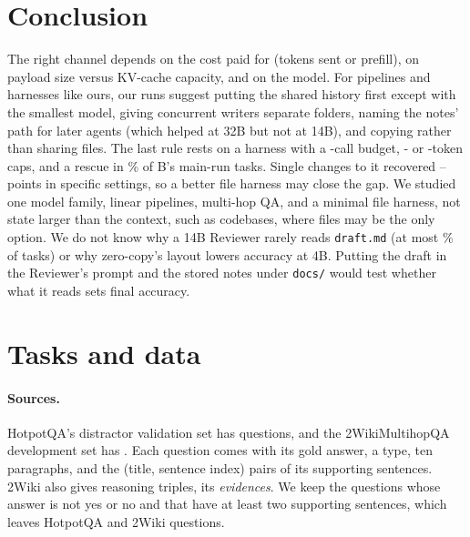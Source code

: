 \documentclass[sigplan,10pt,nonacm,review,anonymous]{acmart}
\begin{document}
\section{Conclusion}
\label{sec:conclusion}

The right channel depends on the cost paid for (tokens sent or prefill), on payload size versus
KV-cache capacity, and on the model. For pipelines and harnesses like ours, our runs suggest putting the
shared history first except with the smallest model, giving concurrent writers separate folders, naming the
notes' path for later agents (which helped at 32B but not at 14B), and copying rather than sharing files. The last rule
rests on a harness with a \nTurns-call budget, \nCapMain- or \nCapSplit-token caps, and a rescue in
\nRThirteenMainRescB{}\% of B's main-run tasks. Single changes to it recovered
\nRFourteenFixMin--\nRFourteenFixMax points in specific settings, so a better file harness may close the gap.
We studied one model family, linear pipelines, multi-hop
QA, and a minimal file harness, not state larger than the context, such as codebases, where files may be the
only option. We do not know why a 14B Reviewer rarely reads \texttt{draft.md} (at most
\nRFourteenRevDraftFourteenMax{}\% of tasks) or why zero-copy's layout lowers
accuracy at 4B. Putting the draft in the Reviewer's prompt and the stored notes under \texttt{docs/} would
test whether what it reads sets final accuracy.




\appendix
\renewcommand{\topfraction}{0.95}
\renewcommand{\dbltopfraction}{0.95}
\renewcommand{\textfraction}{0.05}
\renewcommand{\floatpagefraction}{0.75}
\renewcommand{\dblfloatpagefraction}{0.75}
\setcounter{topnumber}{4}
\setcounter{dbltopnumber}{4}
\setcounter{totalnumber}{6}

\section{Tasks and data}
\label{app:tasks}

\paragraph{Sources.} HotpotQA's distractor validation set has \nAppHotpotAll questions, and the
2WikiMultihopQA development set has \nAppWikiAll. Each question comes with its gold answer, a type, ten
paragraphs, and the (title, sentence index) pairs of its supporting sentences. 2Wiki also gives reasoning
triples, its \emph{evidences}. We keep the
questions whose answer is not yes or no and that have at least two supporting sentences, which leaves
\nHotpotUsable HotpotQA and \nWikiUsable 2Wiki questions.
\end{document}
